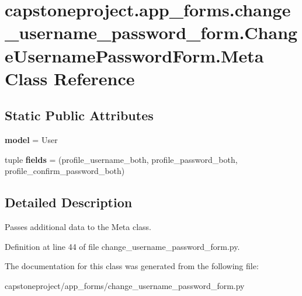 \hypertarget{classcapstoneproject_1_1app__forms_1_1change__username__password__form_1_1_change_username_password_form_1_1_meta}{}\section{capstoneproject.\+app\+\_\+forms.\+change\+\_\+username\+\_\+password\+\_\+form.\+Change\+Username\+Password\+Form.\+Meta Class Reference}
\label{classcapstoneproject_1_1app__forms_1_1change__username__password__form_1_1_change_username_password_form_1_1_meta}
\subsection*{Static Public Attributes}
\begin{DoxyCompactItemize}
\item 
\mbox{\label{classcapstoneproject_1_1app__forms_1_1change__username__password__form_1_1_change_username_password_form_1_1_meta_a134761ab3ea9785274f29e0734723b49}} 
{\bfseries model} = User
\item 
\mbox{\label{classcapstoneproject_1_1app__forms_1_1change__username__password__form_1_1_change_username_password_form_1_1_meta_a51693cb1dd10e6c4e622a5cf335923ce}} 
tuple {\bfseries fields} = (\textquotesingle{}profile\+\_\+username\+\_\+both\textquotesingle{}, \textquotesingle{}profile\+\_\+password\+\_\+both\textquotesingle{}, \textquotesingle{}profile\+\_\+confirm\+\_\+password\+\_\+both\textquotesingle{})
\end{DoxyCompactItemize}


\subsection{Detailed Description}
\begin{DoxyVerb}Passes additional data to the Meta class.
\end{DoxyVerb}
 

Definition at line 44 of file change\+\_\+username\+\_\+password\+\_\+form.\+py.



The documentation for this class was generated from the following file\+:\begin{DoxyCompactItemize}
\item 
capstoneproject/app\+\_\+forms/change\+\_\+username\+\_\+password\+\_\+form.\+py\end{DoxyCompactItemize}
